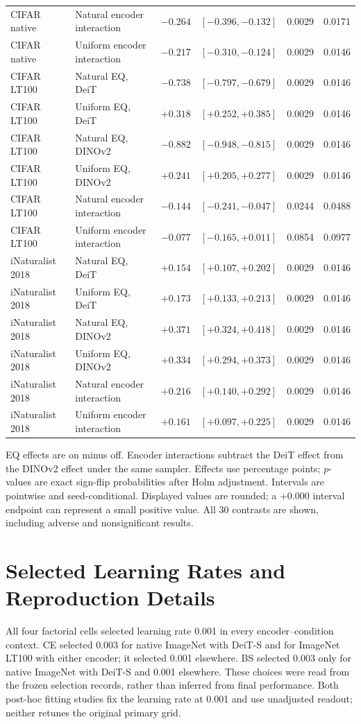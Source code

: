 \documentclass[conference]{IEEEtran}
\begin{document}
\begin{center}
\begin{tabular}{llrrrr}
CIFAR native & Natural encoder interaction & $-0.264$ & $[-0.396,-0.132]$ & 0.0029 & 0.0171 \\
CIFAR native & Uniform encoder interaction & $-0.217$ & $[-0.310,-0.124]$ & 0.0029 & 0.0146 \\
\addlinespace[3pt]
CIFAR LT100 & Natural EQ, DeiT & $-0.738$ & $[-0.797,-0.679]$ & 0.0029 & 0.0146 \\
CIFAR LT100 & Uniform EQ, DeiT & $+0.318$ & $[+0.252,+0.385]$ & 0.0029 & 0.0146 \\
CIFAR LT100 & Natural EQ, DINOv2 & $-0.882$ & $[-0.948,-0.815]$ & 0.0029 & 0.0146 \\
CIFAR LT100 & Uniform EQ, DINOv2 & $+0.241$ & $[+0.205,+0.277]$ & 0.0029 & 0.0146 \\
CIFAR LT100 & Natural encoder interaction & $-0.144$ & $[-0.241,-0.047]$ & 0.0244 & 0.0488 \\
CIFAR LT100 & Uniform encoder interaction & $-0.077$ & $[-0.165,+0.011]$ & 0.0854 & 0.0977 \\
\addlinespace[3pt]
iNaturalist 2018 & Natural EQ, DeiT & $+0.154$ & $[+0.107,+0.202]$ & 0.0029 & 0.0146 \\
iNaturalist 2018 & Uniform EQ, DeiT & $+0.173$ & $[+0.133,+0.213]$ & 0.0029 & 0.0146 \\
iNaturalist 2018 & Natural EQ, DINOv2 & $+0.371$ & $[+0.324,+0.418]$ & 0.0029 & 0.0146 \\
iNaturalist 2018 & Uniform EQ, DINOv2 & $+0.334$ & $[+0.294,+0.373]$ & 0.0029 & 0.0146 \\
iNaturalist 2018 & Natural encoder interaction & $+0.216$ & $[+0.140,+0.292]$ & 0.0029 & 0.0146 \\
iNaturalist 2018 & Uniform encoder interaction & $+0.161$ & $[+0.097,+0.225]$ & 0.0029 & 0.0146 \\
\bottomrule
\end{tabular}\end{center}
\noindent EQ effects are on minus off. Encoder interactions subtract the DeiT effect from the DINOv2 effect under the same sampler. Effects use percentage points; $p$-values are exact sign-flip probabilities after Holm adjustment. Intervals are pointwise and seed-conditional. Displayed values are rounded; a $+0.000$ interval endpoint can represent a small positive value. All 30 contrasts are shown, including adverse and nonsignificant results.

\section{Selected Learning Rates and Reproduction Details}
\label{app:settings}
All four factorial cells selected learning rate 0.001 in every encoder--condition context. CE selected 0.003 for native ImageNet with DeiT-S and for ImageNet LT100 with either encoder; it selected 0.001 elsewhere. BS selected 0.003 only for native ImageNet with DeiT-S and 0.001 elsewhere. These choices were read from the frozen selection records, rather than inferred from final performance. Both post-hoc fitting studies fix the learning rate at 0.001 and use unadjusted readout; neither retunes the original primary grid.
\end{document}
